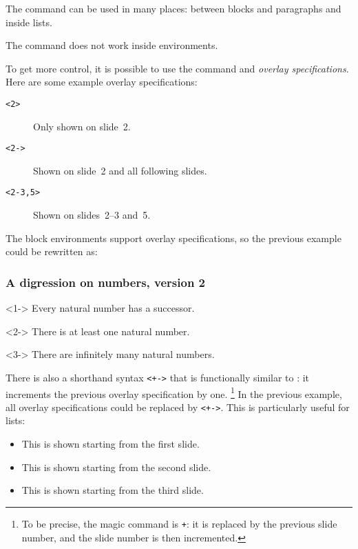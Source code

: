 The  command can be used in many places:
between blocks and paragraphs and inside lists.

\begin{gotcha}
The  command does not work inside  environments.
\end{gotcha}

To get more control, it is possible to use the  command
and \emph{overlay specifications}.
Here are some example overlay specifications:
\begin{description}
\item[\texttt{<2>}] Only shown on slide~2.
\item[\texttt{<2->}] Shown on slide~2 and all following slides.
\item[\texttt{<2-3,5>}] Shown on slides~2--3 and~5.
\end{description}
%
The block environments support overlay specifications,
so the previous example could be rewritten as:
%
\begin{ExampleCode}
\begin{frame}
\frametitle{A digression on numbers, version 2}

\begin{theorem}<1->
Every natural number has a successor.
\end{theorem}

\begin{theorem}<2->
There is at least one natural number.
\end{theorem}

\begin{corollary}<3->
There are infinitely many natural numbers.
\end{corollary}
\end{frame}
\end{ExampleCode}
%
There is also a shorthand syntax \verb|<+->| that is functionally similar to :
it increments the previous overlay specification by one.%
\footnote{To be precise, the magic command is \texttt{+}:
it is replaced by the previous slide number, and the slide number is then incremented.}
In the previous example, all overlay specifications could be replaced by \verb|<+->|.
This is particularly useful for lists:
%
\begin{ExampleCode}
\begin{itemize}
    \item<+-> This is shown starting from the first slide.
    \item<+-> This is shown starting from the second slide.
    \item<+-> This is shown starting from the third slide.
\end{itemize}
\end{ExampleCode}
